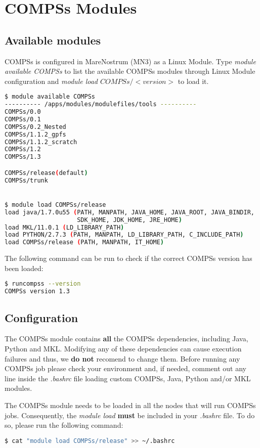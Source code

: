 \section{COMPSs Modules}
\label{sec:Modules}


\subsection{Available modules}
COMPSs is configured in MareNostrum (MN3) as a Linux Module. Type \textit{module available COMPSs} to list the available COMPSs modules 
through Linux Module configuration and \textit{module load $COMPSs/<version>$} to load it.
\begin{lstlisting}[language=bash]
$ module available COMPSs
---------- /apps/modules/modulefiles/tools ----------
COMPSs/0.0                          
COMPSs/0.1
COMPSs/0.2_Nested
COMPSs/1.1.2_gpfs
COMPSs/1.1.2_scratch
COMPSs/1.2 
COMPSs/1.3

COMPSs/release(default)
COMPSs/trunk


$ module load COMPSs/release
load java/1.7.0u55 (PATH, MANPATH, JAVA_HOME, JAVA_ROOT, JAVA_BINDIR, 
                    SDK_HOME, JDK_HOME, JRE_HOME)
load MKL/11.0.1 (LD_LIBRARY_PATH)
load PYTHON/2.7.3 (PATH, MANPATH, LD_LIBRARY_PATH, C_INCLUDE_PATH)
load COMPSs/release (PATH, MANPATH, IT_HOME)
\end{lstlisting}

The following command can be run to check if the correct COMPSs version has been loaded:
\begin{lstlisting}[language=bash]
$ runcompss --version
COMPSs version 1.3

\end{lstlisting}

\subsection{Configuration}
The COMPSs module contains \textbf{all} the COMPSs dependencies, including Java, Python and MKL. Modifying any of these dependencies
can cause execution failures and thus, we \textbf{do not} recomend to change them. Before running any COMPSs job please check your 
environment and, if needed, comment out any line inside the \textit{.bashrc} file loading custom COMPSs, Java, Python and/or MKL
modules.

The COMPSs module needs to be loaded in all the nodes that will run COMPSs jobs. Consequently, the \textit{module load} \textbf{must}
be included in your \textit{.bashrc} file. To do so, please run the following command:
\begin{lstlisting}[language=bash]
$ cat "module load COMPSs/release" >> ~/.bashrc
\end{lstlisting}

